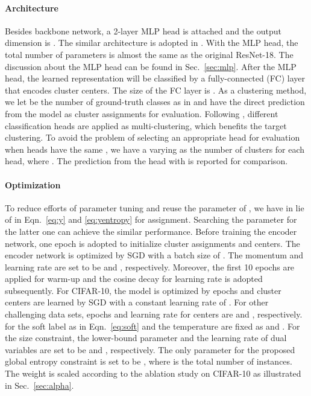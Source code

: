\documentclass[10pt,twocolumn,letterpaper]{article}
\begin{document}
\paragraph{Architecture} Besides backbone network, a 2-layer MLP head is attached and the output dimension is . The similar architecture is adopted in \cite{coke,ZhongW0HDNL021}. With the MLP head, the total number of parameters is almost the same as the original ResNet-18. The discussion about the MLP head can be found in Sec.~\ref{sec:mlp}. After the MLP head, the learned representation will be classified by a fully-connected (FC) layer that encodes cluster centers. The size of the FC layer is . As a clustering method, we let  be the number of ground-truth classes as in \cite{GansbekeVGPG20} and have the direct prediction from the model as cluster assignments for evaluation. Following \cite{AsanoRV20a,GansbekeVGPG20},  different classification heads are applied as multi-clustering, which benefits the target clustering. To avoid the problem of selecting an appropriate head for evaluation when  heads have the same , we have a varying  as the number of clusters for each head, where . The prediction from the head with  is reported for comparison. 



\paragraph{Optimization} To reduce efforts of parameter tuning and reuse the parameter of \cite{coke}, we have  in lie of  in Eqn.~\ref{eq:y} and \ref{eq:yentropy} for assignment. Searching the parameter for the latter one can achieve the similar performance. Before training the encoder network, one epoch is adopted to initialize cluster assignments and centers. The encoder network is optimized by SGD with a batch size of . The momentum and learning rate are set to be  and , respectively. Moreover, the first 10 epochs are applied for warm-up and the cosine decay for learning rate is adopted subsequently. For CIFAR-10, the model is optimized by  epochs and cluster centers are learned by SGD with a constant learning rate of . For other challenging data sets, epochs and learning rate for centers are  and , respectively.  for the soft label as in Eqn.~\ref{eq:soft} and the temperature  are fixed as  and . For the size constraint, the lower-bound parameter  and the learning rate of dual variables  are set to be  and , respectively. The only parameter  for the proposed global entropy constraint is set to be  , where  is the total number of instances. The weight is scaled according to the ablation study on CIFAR-10 as illustrated in Sec.~\ref{sec:alpha}. 
\end{document}
